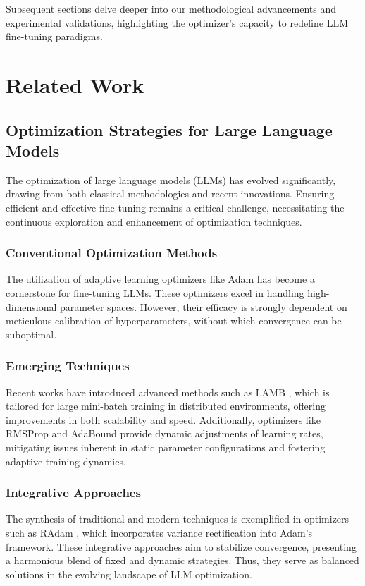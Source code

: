 \documentclass{article} %
\begin{document}
Subsequent sections delve deeper into our methodological advancements and experimental validations, highlighting the optimizer's capacity to redefine LLM fine-tuning paradigms.

\section{Related Work}
\label{sec:related}
\subsection{Optimization Strategies for Large Language Models}
The optimization of large language models (LLMs) has evolved significantly, drawing from both classical methodologies and recent innovations. Ensuring efficient and effective fine-tuning remains a critical challenge, necessitating the continuous exploration and enhancement of optimization techniques.

\subsubsection{Conventional Optimization Methods}
The utilization of adaptive learning optimizers like Adam \cite{kingma2014adam} has become a cornerstone for fine-tuning LLMs. These optimizers excel in handling high-dimensional parameter spaces. However, their efficacy is strongly dependent on meticulous calibration of hyperparameters, without which convergence can be suboptimal.

\subsubsection{Emerging Techniques}
Recent works have introduced advanced methods such as LAMB \cite{you2019large}, which is tailored for large mini-batch training in distributed environments, offering improvements in both scalability and speed. Additionally, optimizers like RMSProp \cite{tieleman2012rmsprop} and AdaBound \cite{luo2019adaptive} provide dynamic adjustments of learning rates, mitigating issues inherent in static parameter configurations and fostering adaptive training dynamics.

\subsubsection{Integrative Approaches}
The synthesis of traditional and modern techniques is exemplified in optimizers such as RAdam \cite{liu2019variance}, which incorporates variance rectification into Adam’s framework. These integrative approaches aim to stabilize convergence, presenting a harmonious blend of fixed and dynamic strategies. Thus, they serve as balanced solutions in the evolving landscape of LLM optimization.
\end{document}
